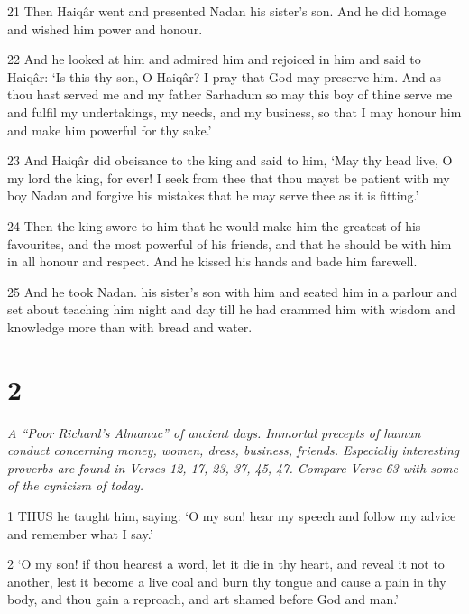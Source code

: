 \par 21 Then Haiqâr went and presented Nadan his sister's son. And he did homage and wished him power and honour.

\par 22 And he looked at him and admired him and rejoiced in him and said to Haiqâr: ‘Is this thy son, O Haiqâr? I pray that God may preserve him. And as thou hast served me and my father Sarhadum so may this boy of thine serve me and fulfil my undertakings, my needs, and my business, so that I may honour him and make him powerful for thy sake.’

\par 23 And Haiqâr did obeisance to the king and said to him, ‘May thy head live, O my lord the king, for ever! I seek from thee that thou mayst be patient with my boy Nadan and forgive his mistakes that he may serve thee as it is fitting.’

\par 24 Then the king swore to him that he would make him the greatest of his favourites, and the most powerful of his friends, and that he should be with him in all honour and respect. And he kissed his hands and bade him farewell.

\par 25 And he took Nadan. his sister's son with him and seated him in a parlour and set about teaching him night and day till he had crammed him with wisdom and knowledge more than with bread and water.



\chapter{2}

\par \textit{A “Poor Richard's Almanac” of ancient days. Immortal precepts of human conduct concerning money, women, dress, business, friends. Especially interesting proverbs are found in Verses 12, 17, 23, 37, 45, 47. Compare Verse 63 with some of the cynicism of today.}

\par 1 THUS he taught him, saying: ‘O my son! hear my speech and follow my advice and remember what I say.’

\par 2 ‘O my son! if thou hearest a word, let it die in thy heart, and reveal it not to another, lest it become a live coal and burn thy tongue and cause a pain in thy body, and thou gain a reproach, and art shamed before God and man.’

